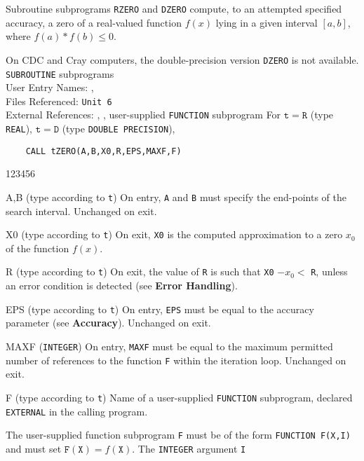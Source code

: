                     
                  
               
                     
Subroutine subprograms {\tt RZERO} and {\tt DZERO} compute,
to an attempted  specified accuracy, a zero of a real-valued function
$f(x)$ lying in a given interval $[a,b]$, where $f(a)*f(b)\le 0$.
\par
On CDC and Cray computers, the double-precision version {\tt DZERO}
is not available.
\Structure
{\tt SUBROUTINE} subprograms \\
User Entry  Names: ,  \\
Files Referenced: {\tt Unit 6} \\
External References: , ,
user-supplied {\tt FUNCTION} subprogram
\Usage
For $\mathtt{t=R}$ (type {\tt REAL}), $\mathtt{t=D}$ (type
{\tt DOUBLE PRECISION}),
\begin{verbatim}
    CALL tZERO(A,B,X0,R,EPS,MAXF,F)
\end{verbatim}
\begin{DLtt}{123456}
\item[A,B] (type according to {\tt t}) On entry, {\tt A} and {\tt B}
must specify the end-points of the search interval. Unchanged on exit.
\item[X0] (type according to {\tt t}) On exit, {\tt X0} is the
computed approximation to a zero $x_0$ of the function $f(x)$.
\item[R] (type according to {\tt t}) On exit, the value of {\tt R} is
such that {\tt X0} $-x_0< $ {\tt R}, unless an error condition is
detected (see {\bf Error Handling}).
\item[EPS] (type according to {\tt t}) On entry, {\tt EPS} must be
equal to the accuracy parameter (see {\bf Accuracy}). Unchanged on exit.
\item[MAXF] ({\tt INTEGER}) On entry, {\tt MAXF} must be equal
to the maximum permitted number of references to the
function {\tt F} within the iteration loop. Unchanged on exit.
\item[F] (type according to {\tt t}) Name of a user-supplied
{\tt FUNCTION} subprogram, declared {\tt EXTERNAL} in the calling
program.
\end{DLtt}
The user-supplied function subprogram {\tt F} must be of the form
{\tt FUNCTION  F(X,I)} and must set
$\mathtt{F(X)} = f(\mathtt{X})$. The {\tt INTEGER} argument {\tt I}

